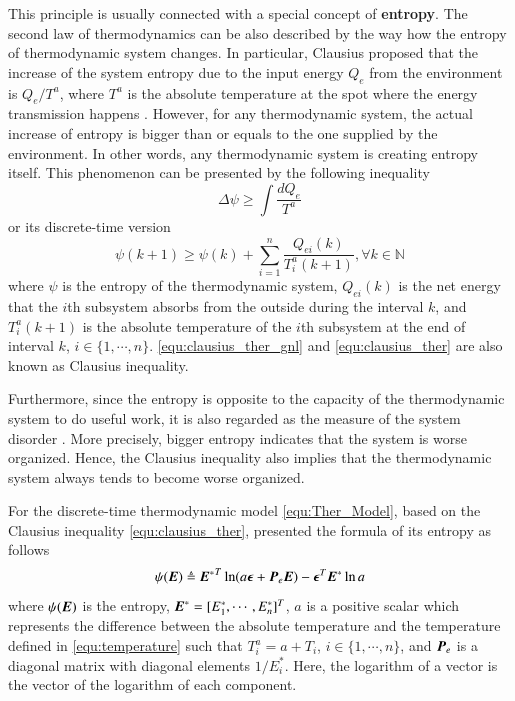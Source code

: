 \documentclass[preprint,authoryear,12pt]{elsarticle}
\renewcommand{\vec}[1]{\mbox{\boldmath$#1$}}
\newcommand{\mat}[1]{\mbox{\boldmath$#1$}}
\begin{document}
This principle is usually connected with a special concept of
\textbf{entropy}. The second law of thermodynamics can be also
described by the way how the entropy of thermodynamic system changes.
In particular, Clausius proposed that the increase of the system
entropy due to the input energy $Q_e$ from the environment is
$Q_e/T^a$, where $T^a$ is the absolute temperature at the spot where
the energy transmission happens \citep{clausius_mechanical_1867}.
However, for any thermodynamic system, the actual increase of entropy
is bigger than or equals to the one supplied by the environment. In
other words, any thermodynamic system is creating entropy itself.
This phenomenon can be presented by the following inequality
\begin{equation}\label{equ:clausius_ther_gnl}
\Delta \psi \ge \int\frac{dQ_e}{T^a}
\end{equation}
or its discrete-time version \citep{haddad_thermodynamic_2005}
\begin{equation}\label{equ:clausius_ther}
\psi(k+1) \ge \psi(k)+\sum_{i=1}^{n}\frac{Q_{ei}(k)}{T^a_i(k+1)},
\forall k\in\mathbb{N}
\end{equation}
where $\psi$ is the entropy of the thermodynamic system, $Q_{ei}(k)$
is the net energy that the $i$th subsystem absorbs from the outside
during the interval $k$, and $T^a_i(k+1)$ is the absolute temperature
of the $i$th subsystem at the end of interval $k$,
$i\in\{1,\cdots,n\}$. \eqref{equ:clausius_ther_gnl} and
\eqref{equ:clausius_ther} are also known as Clausius inequality.

Furthermore, since the entropy is opposite to the capacity of the
thermodynamic system to do useful work, it is also regarded as the
measure of the system disorder \citep{balmakov_entropy_2001}. More
precisely, bigger entropy indicates that the system is worse
organized. Hence, the Clausius inequality also implies that the
thermodynamic system always tends to become worse organized.

For the discrete-time thermodynamic model \eqref{equ:Ther_Model},
based on the Clausius inequality \eqref{equ:clausius_ther},
\citet{haddad_thermodynamic_2005} presented the formula of its
entropy as follows
\begin{equation}
\psi(\vec{E}) \triangleq{\vec{E}^*}^T \ln
(a\vec{\epsilon}+\mat{P}_e\vec{E}) -\vec{\epsilon}^T\vec{E}^*\ln a
\label{equ:Ther_entropy}
\end{equation}
where $\psi(\vec{E})$ is the entropy,
$\vec{E}^*=[E^*_1,\cdots,E^*_n]^T$, $a$ is a positive scalar which
represents the difference between the absolute temperature and the
temperature defined in \eqref{equ:temperature} such that
$T^a_i=a+T_i$, $i\in\{1,\cdots,n\}$, and $\mat{P}_e$ is a diagonal
matrix with diagonal elements $1/E^*_i$. Here, the logarithm of a
vector is the vector of the logarithm of each component.
\end{document}
